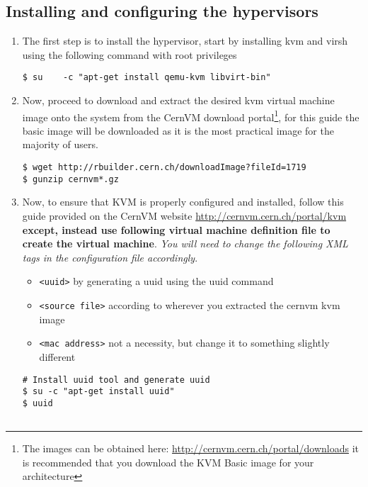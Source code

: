 \subsection{Installing and configuring the hypervisors}
\label{sec:debianhypervisor}
\begin{enumerate}
\item The first step is to install the hypervisor, start by installing kvm and virsh using the following command with root privileges
\lstset{caption=Installing KVM and Virsh Support}
\begin{lstlisting}
$ su 	-c "apt-get install qemu-kvm libvirt-bin"
\end{lstlisting}

\item 	Now, proceed to download and extract the desired kvm virtual machine image onto the system from the CernVM download 		
		portal\footnote{The images can be obtained here: \url{http://cernvm.cern.ch/portal/downloads} it is recommended that you 
		download the KVM Basic image for your architecture}, for this guide the basic image will be downloaded as it is the most 
		practical image for the majority of users.

\lstset{caption=Download and Extract CernVM KVM Basic Image}
\begin{lstlisting}
$ wget http://rbuilder.cern.ch/downloadImage?fileId=1719
$ gunzip cernvm*.gz
\end{lstlisting}

\item 	Now, to ensure that KVM is properly configured and installed, follow this guide provided on the CernVM website
		\url{http://cernvm.cern.ch/portal/kvm} {\bf except, instead use following virtual machine definition file to 
		create the virtual machine}. \emph{You will need to change the following XML tags in the configuration file accordingly}.
		
\begin{itemize}
\item \verb|<uuid>| by generating a uuid using the uuid command
\item \verb|<source file>| according to wherever you extracted the cernvm kvm image
\item \verb|<mac address>| not a necessity, but change it to something slightly different
\end{itemize}

\lstset{caption=Create CernVM KVM Definition File}
\begin{lstlisting}
# Install uuid tool and generate uuid
$ su -c "apt-get install uuid"
$ uuid


\end{lstlisting}
\end{enumerate}
